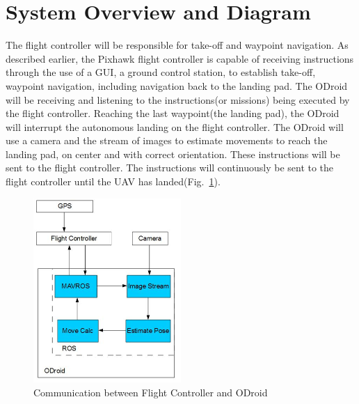 \section{System Overview and Diagram}
The flight controller will be responsible for take-off and waypoint navigation. As described earlier, the Pixhawk flight controller is capable of receiving instructions through the use of a GUI, a ground control station, to establish take-off, waypoint navigation, including navigation back to the landing pad. The ODroid will be receiving and listening to the instructions(or missions) being executed by the flight controller. Reaching the last waypoint(the landing pad), the ODroid will interrupt the autonomous landing on the flight controller. The ODroid will use a camera and the stream of images to estimate movements to reach the landing pad, on center and with correct orientation. These instructions will be sent to the flight controller. The instructions will continuously be sent to the flight controller until the UAV has landed(Fig.~\ref{overviewdiag}).\\ 

\begin{figure}[h]
\begin{center}
\includegraphics[width=0.5\textwidth]{broad_approach1.PNG}
\end{center}
\caption{Communication between Flight Controller and ODroid \label{overviewdiag}}
\end{figure}

